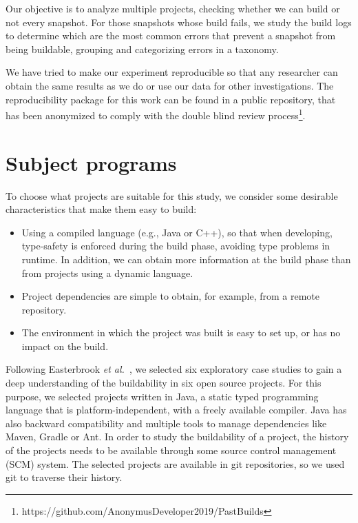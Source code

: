 Our objective is to analyze multiple projects, checking whether we can build  or not every snapshot.
For those snapshots whose build fails, we study the build logs to determine which are the most common errors that prevent a snapshot from being buildable, grouping and categorizing errors in a taxonomy.

 
We have tried to make our experiment reproducible so that any researcher can obtain the same results as we do or use our data for other investigations.
The reproducibility package for this work can be found in a public repository, that has been anonymized to comply with the double blind review process\footnote{https://github.com/AnonymusDeveloper2019/PastBuilds}.


\section{Subject programs}

To choose what projects are suitable for this study, we consider some desirable characteristics that make them easy to build:

\begin{itemize}
	\item Using a compiled language (e.g., Java or C++), so that when developing, type-safety is enforced during the build phase, avoiding type problems in runtime.
In addition, we can obtain more information at the build phase than from projects using a dynamic language.
	\item Project dependencies are simple to obtain, for example, from a remote repository.
	\item The environment in which the project was built is easy to set up, or has no impact on the build.
\end{itemize}

Following Easterbrook \emph{et al.}~\cite{easterbrook2008selecting}, we selected six exploratory case studies to gain a deep understanding of the buildability in six open source projects.
For this purpose, we selected projects written in Java, a static typed programming language that is platform-independent, with a freely available compiler.
Java has also backward compatibility and multiple tools to manage dependencies like Maven, Gradle or Ant.
In order to study the buildability of a project, the history of the projects needs to be available through some source control management (SCM) system.
The selected projects are available in git repositories, so we used git to traverse their history.

